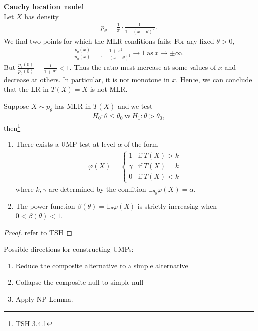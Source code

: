 \begin{example}
    \textbf{Cauchy location model}\\
    Let $X$ has density 
    \begin{gather}
        p_\theta=\frac{1}{\pi}\cdot\frac{1}{1+(x-\theta)^2}.
    \end{gather}
    We find two points for which the MLR conditions fails:
    For any fixed $\theta>0$,
    \begin{gather}
        \frac{p_\theta(x)}{p_0(x)}=\frac{1+x^2}{1+(x-\theta)^2}\to{1}~\text{as}~x\to\pm\infty.
    \end{gather}
    But $\frac{p_\theta(0)}{p_0(0)}=\frac{1}{1+\theta^2}<1$.
    Thus the ratio must increase at some values of $x$ and decrease at others.
    In particular, it is not monotone in $x$.
    Hence, we can conclude that the LR in $T(X)=X$ is not MLR.
\end{example}

\begin{theorem}
    Suppose $X\sim p_\theta$ has MLR in $T(X)$ and we test
    \begin{gather}
        H_0:\theta\leq\theta_0~\text{vs}~H_1:\theta>\theta_0,
    \end{gather}
    then\footnote{
    TSH 3.4.1
    }
    \begin{enumerate}[{(i)}]
        \item There exists a UMP test at level $\alpha$ of the form
        \begin{gather}
            \varphi(X)=\left\{\begin{array}{ll}
                1 & \text{if}~T(X)>k \\
                \gamma & \text{if}~T(X)=k \\
                0 & \text{if}~T(X)<k 
            \end{array}\right.
        \end{gather}
        where $k,\gamma$ are determined by the condition $\mathbb{E}_{\theta_0}\varphi(X)=\alpha$.
        \item The power function $\beta(\theta)=\mathbb{E}_\theta\varphi(X)$ is strictly increasing when $0<\beta(\theta)<1$.
    \end{enumerate}
\end{theorem}
\begin{proof}
    refer to TSH
\end{proof}

\begin{note}
    Possible directions for constructing UMPs:
    \begin{enumerate}
        \item Reduce the composite alternative to a simple alternative
        \item Collapse the composite null to simple null
        \item Apply NP Lemma.
    \end{enumerate}
\end{note}

